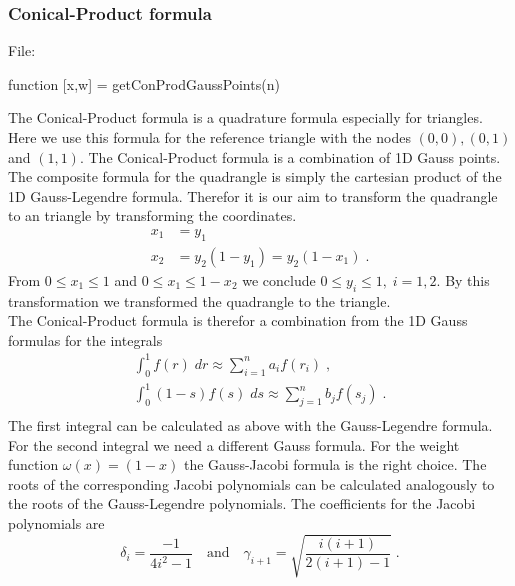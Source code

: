 \subsubsection{Conical-Product formula}$ $\\
File: 
\begin{pcode}
function [x,w] = getConProdGaussPoints(n)
\end{pcode}

\medskip
\noindent
The Conical-Product formula is a quadrature formula especially for triangles. Here we use this formula for the reference triangle with the nodes $(0,0),(0,1)$ and $(1,1)$. The Conical-Product formula is a combination of 1D Gauss points.\\
The composite formula for the quadrangle is simply the cartesian product of the 1D Gauss-Legendre formula.
Therefor it is our aim to transform the quadrangle to an triangle by transforming the coordinates.
\begin{equation*}
\begin{split}
    x_1 &= y_1\\
    x_2 &= y_2(1-y_1) = y_2(1-x_1)\; .
\end{split}
\end{equation*}
From $0\leq x_1\leq 1$ and $0\leq x_1\leq 1-x_2$ we conclude $0\leq y_i\leq 1,\; i=1,2$. By this transformation we transformed the quadrangle to the triangle.\\
The Conical-Product formula is therefor a combination from the 1D Gauss formulas for the integrals
\begin{equation*}
\begin{split}
    \int_0^1 f(r)\; dr \approx \sum_{i=1}^n a_i f(r_i) \; , \\
    \int_0^1 (1-s)f(s)\; ds \approx \sum_{j=1}^n b_j f(s_j) \; .\\
\end{split}
\end{equation*}
The first integral can be calculated as above with the Gauss-Legendre formula. For the second integral we need a different Gauss formula. For the weight function $\omega(x) = (1-x)$ the Gauss-Jacobi formula is the right choice. The roots of the corresponding Jacobi polynomials can be calculated analogously to the roots of the Gauss-Legendre polynomials. The coefficients for the Jacobi polynomials are
\begin{equation*}
\delta_i = \frac{-1}{4i^2-1}\quad\textrm{and}\quad \gamma_{i+1} = \sqrt{\frac{i(i+1)}{2(i+1)-1}}\; .
\end{equation*}
